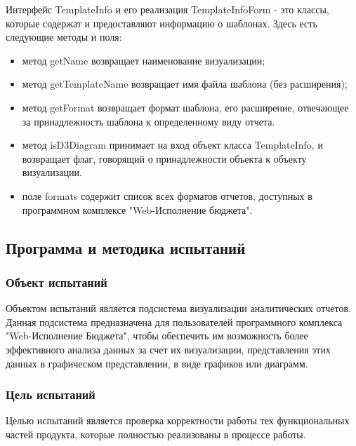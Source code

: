 \documentclass[a4paper]{extarticle}
\numberwithin{equation}{section}
\begin{document}
Интерфейс TemplateInfo и его реализация TemplateInfoForm - это классы, которые содержат и предоставляют информацию о шаблонах. Здесь есть следующие методы и поля:
\begin{itemize}
\item метод getName возвращает наименование визуализации;
\item метод getTemplateName возвращает имя файла шаблона (без расширения);
\item метод getFormat возвращает формат шаблона, его расширение, отвечающее за принадлежность шаблона к определенному виду отчета.
\item метод isD3Diagram принимает на вход объект класса TemplateInfo, и возвращает флаг, говорящий о принадлежности объекта к объекту визуализации.
\item поле formats содержит список всех форматов отчетов, доступных в программном комплексе "Web-Исполнение бюджета".
\end{itemize}

\subsection{Программа и методика испытаний}

\subsubsection{Объект испытаний}
Объектом испытаний является подсистема визуализации аналитических отчетов. Данная подсистема предназначена для пользователей программного комплекса "Web-Исполнение Бюджета", чтобы обеспечить им возможность более эффективного анализа данных за счет их визуализации, представления этих данных в графическом представлении, в виде графиков или диаграмм.

\subsubsection{Цель испытаний}
Целью испытаний является проверка корректности работы тех функциональных частей продукта, которые полностью реализованы в процессе  работы.\par
\end{document}
